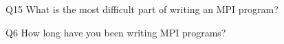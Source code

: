 \begin{description}%
\item{Q15} What is the most difficult part of writing an MPI program?%
\item{Q6} How long have you been writing MPI programs?%
\end{description}%
